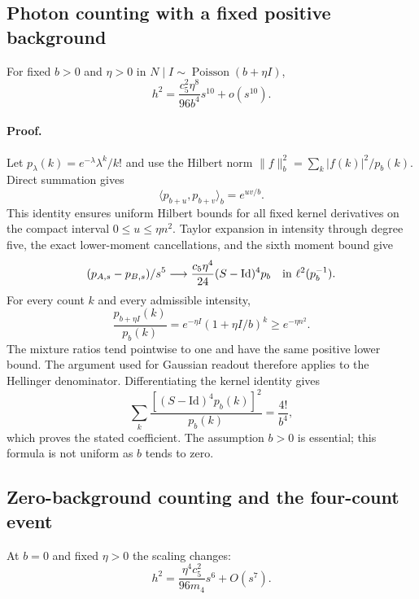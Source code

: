 \subsection{Photon counting with a fixed positive background}

For fixed $b>0$ and $\eta>0$ in $N\mid I\sim\operatorname{Poisson}(b+\eta I)$,
\begin{equation}\label{eq:hellinger-positive-background}
 \boxed{\displaystyle
 h^2=\frac{c_5^2\eta^8}{96b^4}s^{10}+o(s^{10}).}
\end{equation}

\paragraph{Proof.}
Let $p_\lambda(k)=e^{-\lambda}\lambda^k/k!$ and use the Hilbert norm
$\|f\|_b^2=\sum_k |f(k)|^2/p_b(k)$. Direct summation gives
\[
 \langle p_{b+u},p_{b+v}\rangle_b=e^{uv/b}.
\]
This identity ensures uniform Hilbert bounds for all fixed kernel derivatives
on the compact interval $0\le u\le\eta n^2$. Taylor expansion in intensity
through degree five, the exact lower-moment cancellations, and the sixth
moment bound give
\[
 (p_{A,s}-p_{B,s})/s^5
 \longrightarrow \frac{c_5\eta^4}{24}(S-\mathrm{Id})^4p_b
 \quad\hbox{in }\ell^2(p_b^{-1}).
\]
For every count $k$ and every admissible intensity,
\[
 \frac{p_{b+\eta I}(k)}{p_b(k)}
 =e^{-\eta I}(1+\eta I/b)^k\ge e^{-\eta n^2}.
\]
The mixture ratios tend pointwise to one and have the same positive lower
bound. The argument used for Gaussian readout therefore applies to the
Hellinger denominator. Differentiating the kernel identity gives
\[
 \sum_k\frac{[(S-\mathrm{Id})^4p_b(k)]^2}{p_b(k)}=\frac{4!}{b^4},
\]
which proves the stated coefficient. The assumption $b>0$ is essential;
this formula is not uniform as $b$ tends to zero.

\subsection{Zero-background counting and the four-count event}

At $b=0$ and fixed $\eta>0$ the scaling changes:
\begin{equation}\label{eq:hellinger-zero-background}
 \boxed{\displaystyle
 h^2=\frac{\eta^4c_5^2}{96m_4}s^6+O(s^7).}
\end{equation}

